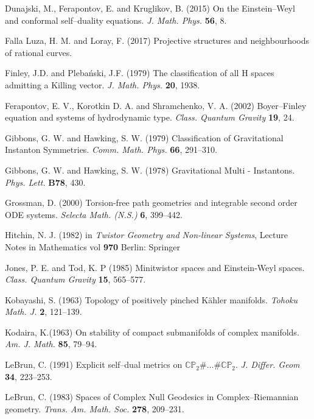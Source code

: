 \begin{thebibliography}{}
 Dunajski, M., Ferapontov, E. and Kruglikov, B. (2015)
On the Einstein--Weyl and conformal self--duality equations. \textit{J. Math. Phys.} {\bf 56}, 8.

 Falla Luza, H. M. and Loray, F. (2017)  Projective structures and neighbourhoods of rational curves.

 Finley, J.D. and Pleba\'nski, J.F. (1979) The classification of all H spaces admitting a Killing
vector. \textit{J. Math. Phys.} {\bf 20}, 1938.

  Ferapontov, E.  V., Korotkin D. A.  and Shramchenko, V. A. (2002)
Boyer–Finley equation and systems of hydrodynamic type.
\textit{Class. Quantum Gravity} {\bf 19}, 24.

 Gibbons, G. W. and Hawking, S. W. (1979) Classification of Gravitational Instanton Symmetries.
\textit{Comm. Math. Phys.} {\bf 66}, 291--310.

Gibbons, G. W. and Hawking, S. W. (1978)
Gravitational Multi - Instantons.
\textit{Phys. Lett.} \textbf{B78},
430.


 Grossman, D. (2000) Torsion-free path geometries and integrable second order ODE systems. \textit{Selecta
Math. (N.S.)} {\bf 6}, 399--442.

 Hitchin, N. J. (1982) in {\em Twistor Geometry and Non-linear Systems}, Lecture Notes in Mathematics vol {\bf 970} Berlin: Springer

Jones, P. E. and  Tod, K. P (1985)
Minitwistor spaces and Einstein-Weyl spaces. 
\textit{Class. Quantum Gravity} {\bf 15}, 565--577.

Kobayashi, S. (1963)
Topology of positively pinched K\"ahler manifolds.
\textit{Tohoku Math. J.} {\bf 2}, 121--139.

 Kodaira, K.(1963)
On stability of compact submanifolds of complex manifolds.
\textit{Am. J. Math.} {\bf 85}, 79--94.

 LeBrun, C. (1991)
Explicit self--dual metrics on $\mathbb{CP}_2\#\dots \#\mathbb{CP}_2$.
\textit{J. Differ. Geom} {\bf 34}, 223--253.

 LeBrun, C. (1983)
Spaces of Complex Null Geodesics in Complex--Riemannian geometry. \textit{Trans. Am. Math. Soc.} {\bf 278}, 209--231.


\end{thebibliography}
